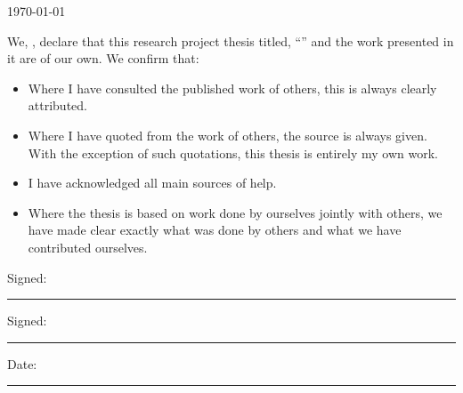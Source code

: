 \documentclass[
11pt, %
english, %
singlespacing, %
headsepline, %
]{MastersDoctoralThesis} %
\begin{document}
\begin{titlepage}
\begin{center}
\vfill

 
\vfill

{\large \today}\\[4cm] %
 
\vfill
\end{center}
\end{titlepage}


\begin{declaration}
\addchaptertocentry{\authorshipname} %

\noindent We, \authorname, declare that this research project thesis titled, \enquote{\ttitle} and the work presented in it are of our own. We confirm that:

\begin{itemize} 
\item Where I have consulted the published work of others, this is always clearly attributed.
\item Where I have quoted from the work of others, the source is always given. With the exception of such quotations, this thesis is entirely my own work.
\item I have acknowledged all main sources of help.
\item Where the thesis is based on work done by ourselves jointly with others, we have made clear exactly what was done by others and what we have contributed ourselves.\\
\end{itemize}
 
\noindent Signed:\\
\rule[0.5em]{25em}{0.5pt} %

\noindent Signed:\\
\rule[0.5em]{25em}{0.5pt} %

\noindent Date:\\
\rule[0.5em]{25em}{0.5pt} %
\end{declaration}
\end{document}
